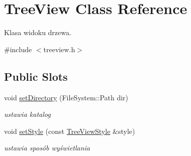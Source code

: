 \hypertarget{class_tree_view}{
\section{TreeView Class Reference}
\label{class_tree_view}
}


Klasa widoku drzewa.  




{\ttfamily \#include $<$treeview.h$>$}

\subsection*{Public Slots}
\begin{DoxyCompactItemize}
\item 
\hypertarget{class_tree_view_a8a4a5fc7c09b9713a255cd5ee0cadcdc}{
void \hyperlink{class_tree_view_a8a4a5fc7c09b9713a255cd5ee0cadcdc}{setDirectory} (FileSystem::Path dir)}
\label{class_tree_view_a8a4a5fc7c09b9713a255cd5ee0cadcdc}

\begin{DoxyCompactList}\small\item\em ustawia katalog \item\end{DoxyCompactList}\item 
\hypertarget{class_tree_view_ad6590db774d257781dccfabe243cf300}{
void \hyperlink{class_tree_view_ad6590db774d257781dccfabe243cf300}{setStyle} (const \hyperlink{class_tree_view_style}{TreeViewStyle} \&style)}
\label{class_tree_view_ad6590db774d257781dccfabe243cf300}

\begin{DoxyCompactList}\small\item\em ustawia sposób wyświetlania \item\end{DoxyCompactList}\end{DoxyCompactItemize}

